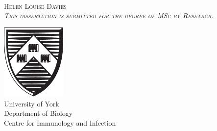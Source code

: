 
{
\pagestyle{empty}

\centering
\null\vfill


\fontsize{36.5}{34}\scshape{}
\\[2cm]%

\fontsize{24}{30}\normalfont
Helen Louise Davies\\[0.5cm]%

\fontsize{13}{16}\itshape
This dissertation is submitted for the degree of MSc by Research.

\vfill

\includegraphics[width=3.2cm]{Figures/Shield.eps}\\[0.6cm]

\fontsize{16}{20}\normalfont
University of York\\
Department of Biology\\
Centre for Immunology and Infection\\[10pt]


\vfill

\fontsize{20}{30}\normalfont
\monthname\space\number\year


\vfill\null

\restoregeometry
}